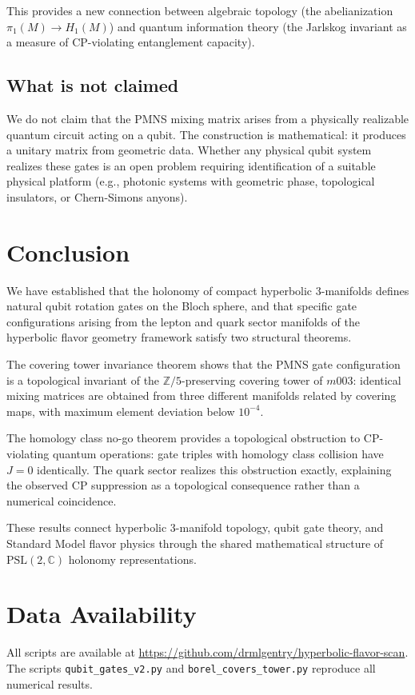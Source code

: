 \documentclass[12pt]{article}
\theoremstyle{definition}
\begin{document}
This provides a new connection between algebraic topology
(the abelianization $\pi_1(M) \to H_1(M)$) and quantum
information theory (the Jarlskog invariant as a measure of
CP-violating entanglement capacity).

\subsection{What is not claimed}

We do not claim that the PMNS mixing matrix arises from a
physically realizable quantum circuit acting on a qubit. The
construction is mathematical: it produces a unitary matrix from
geometric data. Whether any physical qubit system realizes these
gates is an open problem requiring identification of a suitable
physical platform (e.g., photonic systems with geometric phase,
topological insulators, or Chern-Simons anyons).

\section{Conclusion}
\label{sec:conclusion}

We have established that the holonomy of compact hyperbolic
3-manifolds defines natural qubit rotation gates on the Bloch
sphere, and that specific gate configurations arising from the
lepton and quark sector manifolds of the hyperbolic flavor
geometry framework satisfy two structural theorems.

The covering tower invariance theorem shows that the PMNS gate
configuration is a topological invariant of the
$\mathbb{Z}/5$-preserving covering tower of $m003$: identical
mixing matrices are obtained from three different manifolds
related by covering maps, with maximum element deviation below
$10^{-4}$.

The homology class no-go theorem provides a topological
obstruction to CP-violating quantum operations: gate triples
with homology class collision have $J = 0$ identically. The
quark sector realizes this obstruction exactly, explaining the
observed CP suppression as a topological consequence rather
than a numerical coincidence.

These results connect hyperbolic 3-manifold topology, qubit
gate theory, and Standard Model flavor physics through the
shared mathematical structure of $\mathrm{PSL}(2,\mathbb{C})$
holonomy representations.

\section*{Data Availability}
All scripts are available at
\url{https://github.com/drmlgentry/hyperbolic-flavor-scan}.
The scripts \texttt{qubit\_gates\_v2.py} and
\texttt{borel\_covers\_tower.py} reproduce all numerical
results.
\end{document}
